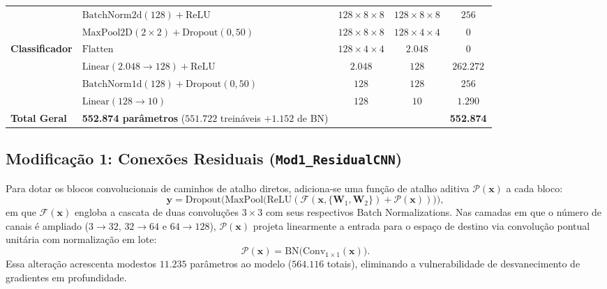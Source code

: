 \documentclass[runningheads]{llncs}
\begin{document}
\begin{table}[H]
\begin{tabular}{llccc}
& $\text{BatchNorm2d}(128) + \text{ReLU}$ & $128 \times 8 \times 8$ & $128 \times 8 \times 8$ & $256$ \\
& $\text{MaxPool2D}(2 \times 2) + \text{Dropout}(0{,}50)$ & $128 \times 8 \times 8$ & $128 \times 4 \times 4$ & $0$ \\
\midrule
\textbf{Classificador} & $\text{Flatten}$ & $128 \times 4 \times 4$ & $2.048$ & $0$ \\
& $\text{Linear}(2.048 \to 128) + \text{ReLU}$ & $2.048$ & $128$ & $262.272$ \\
& $\text{BatchNorm1d}(128) + \text{Dropout}(0{,}50)$ & $128$ & $128$ & $256$ \\
& $\text{Linear}(128 \to 10)$ & $128$ & $10$ & $1.290$ \\
\midrule
\textbf{Total Geral} & \textbf{552.874 par\^{a}metros} ($551.722$ trein\'{a}veis $+ 1.152$ de BN) & & & \textbf{552.874} \\
\bottomrule
\end{tabular}
\end{table}

\subsection{Modifica\c{c}\~{a}o 1: Conex\~{o}es Residuais (\texttt{Mod1\_ResidualCNN})}
Para dotar os blocos convolucionais de caminhos de atalho diretos, adiciona-se uma fun\c{c}\~{a}o de atalho aditiva $\mathcal{P}(\mathbf{x})$ a cada bloco:
\begin{equation}
    \mathbf{y} = \text{Dropout}\Big(\text{MaxPool}\big(\text{ReLU}(\mathcal{F}(\mathbf{x}, \{\mathbf{W}_1, \mathbf{W}_2\}) + \mathcal{P}(\mathbf{x}))\big)\Big),
    \label{eq:res_formula}
\end{equation}
em que $\mathcal{F}(\mathbf{x})$ engloba a cascata de duas convolu\c{c}\~{o}es $3 \times 3$ com seus respectivos Batch Normalizations. Nas camadas em que o n\'{u}mero de canais \'{e} ampliado ($3 \to 32$, $32 \to 64$ e $64 \to 128$), $\mathcal{P}(\mathbf{x})$ projeta linearmente a entrada para o espa\c{c}o de destino via convolu\c{c}\~{a}o pontual unit\'{a}ria com normaliza\c{c}\~{a}o em lote:
\begin{equation}
    \mathcal{P}(\mathbf{x}) = \text{BN}\big(\text{Conv}_{1 \times 1}(\mathbf{x})\big).
\end{equation}
Essa altera\c{c}\~{a}o acrescenta modestos $11.235$ par\^{a}metros ao modelo ($564.116$ totais), eliminando a vulnerabilidade de desvanecimento de gradientes em profundidade.
\end{document}
